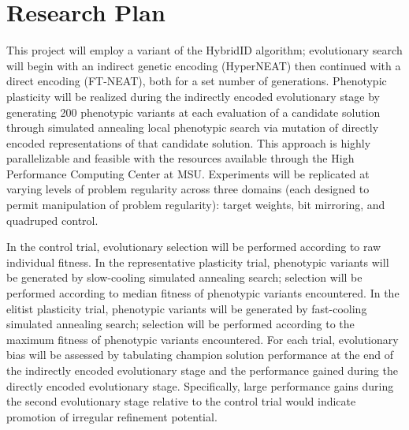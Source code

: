 \renewcommand{\thefootnote}{\fnsymbol{footnote}}
\section{Research Plan}
This project will employ a variant of the HybridID \autocite{Clune2011OnRegularity} algorithm;
evolutionary search will begin with an indirect genetic encoding (HyperNEAT) then continued with a direct encoding (FT-NEAT), both for a set number of generations.
Phenotypic plasticity will be realized during the indirectly encoded evolutionary stage by generating 200 phenotypic variants at each evaluation of a candidate solution through simulated annealing local phenotypic search via mutation of directly encoded representations of that candidate solution.
This approach is highly parallelizable\autocite{Mengistu2016EvolvabilityIt} and feasible with the resources available through the High Performance Computing Center at MSU.
Experiments will be replicated at varying levels of problem regularity across three domains (each designed to permit manipulation of problem regularity): target weights, bit mirroring, and quadruped control.\autocite{Clune2011OnRegularity}

In the control trial, evolutionary selection will be performed according to raw individual fitness.
In the representative plasticity trial, phenotypic variants will be generated by slow-cooling simulated annealing search;
selection will be performed according to median fitness of phenotypic variants encountered.
In the elitist plasticity trial, phenotypic variants will be generated by fast-cooling simulated annealing search;
selection will be performed according to the maximum fitness of phenotypic variants encountered.
For each trial, evolutionary bias will be assessed by tabulating champion solution performance at the end of the indirectly encoded evolutionary stage and the performance gained during the directly encoded evolutionary stage.
Specifically, large performance gains during the second evolutionary stage relative to the control trial would indicate promotion of irregular refinement potential.
